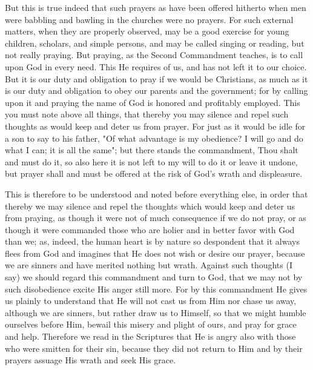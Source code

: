 But this is true indeed that such prayers as have been offered
hitherto when men were babbling and bawling in the churches were no
prayers. For such external matters, when they are properly observed,
may be a good exercise for young children, scholars, and simple
persons, and may be called singing or reading, but not really praying.
But praying, as the Second Commandment teaches, is to call upon God in
every need. This He requires of us, and has not left it to our choice.
But it is our duty and obligation to pray if we would be Christians, as
much as it is our duty and obligation to obey our parents and the
government; for by calling upon it and praying the name of God is
honored and profitably employed. This you must note above all things,
that thereby you may silence and repel such thoughts as would keep and
deter us from prayer. For just as it would be idle for a son to say to
his father, "Of what advantage is my obedience? I will go and do what
I can; it is all the same"; but there stands the commandment, Thou
shalt and must do it, so also here it is not left to my will to do it
or leave it undone, but prayer shall and must be offered at the risk of
God's wrath and displeasure.

This is therefore to be understood and noted before everything else, in
order that thereby we may silence and repel the thoughts which would
keep and deter us from praying, as though it were not of much
consequence if we do not pray, or as though it were commanded those who
are holier and in better favor with God than we; as, indeed, the human
heart is by nature so despondent that it always flees from God and
imagines that He does not wish or desire our prayer, because we are
sinners and have merited nothing but wrath. Against such thoughts (I
say) we should regard this commandment and turn to God, that we may not
by such disobedience excite His anger still more. For by this
commandment He gives us plainly to understand that He will not cast us
from Him nor chase us away, although we are sinners, but rather draw
us to Himself, so that we might humble ourselves before Him, bewail
this misery and plight of ours, and pray for grace and help. Therefore
we read in the Scriptures that He is angry also with those who were
smitten for their sin, because they did not return to Him and by their
prayers assuage His wrath and seek His grace.

